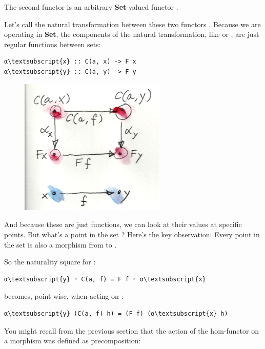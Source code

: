 The second functor is an arbitrary \textbf{Set}-valued functor
.

Let's call the natural transformation between these two functors
. Because we are operating in \textbf{Set}, the components of
the natural transformation, like  or , are just
regular functions between sets:

\begin{Verbatim}[commandchars=\\\{\}]
α\textsubscript{x} :: C(a, x) -> F x
α\textsubscript{y} :: C(a, y) -> F y
\end{Verbatim}

\begin{figure}[H]
\centering
\includegraphics[width=2.73958in]{images/yoneda1.png}
\end{figure}

\noindent
And because these are just functions, we can look at their values at
specific points. But what's a point in the set ? Here's
the key observation: Every point in the set  is also a
morphism  from  to .

So the naturality square for :

\begin{Verbatim}[commandchars=\\\{\}]
α\textsubscript{y} ◦ C(a, f) = F f ◦ α\textsubscript{x}
\end{Verbatim}
becomes, point-wise, when acting on :

\begin{Verbatim}[commandchars=\\\{\}]
α\textsubscript{y} (C(a, f) h) = (F f) (α\textsubscript{x} h)
\end{Verbatim}
You might recall from the previous section that the action of the
hom-functor  on a morphism  was defined as
precomposition:


